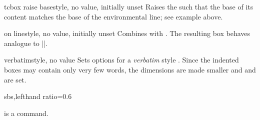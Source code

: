 \begin{docTcbKey}{tcbox raise base}{}{style, no value, initially unset}
  Raises the  such that the base of its content matches
  the base of the environmental line; see example above.
\end{docTcbKey}

\begin{docTcbKey}{on line}{}{style, no value, initially unset}
  Combines  with .
  The resulting box behaves analogue to |\fbox|.
\end{docTcbKey}

\begin{docTcbKey}{verbatim}{}{style, no value}
  Sets options for a \textit{verbatim} style .
  Since the indented boxes may contain only very few words, the
  dimensions are made smaller and 
  and  are set.
\begin{dispExample*}{sbs,lefthand ratio=0.6}

\myverb{\textbf} is a \myverb{\LaTeX} command.
\end{dispExample*}
\end{docTcbKey}



